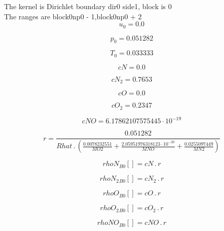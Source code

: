 \documentclass{article}
\begin{document}
\noindent The kernel is Dirichlet boundary dir0 side1, block is 0\\\noindent The ranges are block0np0 - 1,block0np0 + 2\\\begin{dmath}u_{0} = 0.0\end{dmath}

\begin{dmath}p_{0} = 0.051282\end{dmath}

\begin{dmath}T_{0} = 0.033333\end{dmath}

\begin{dmath}cN = 0.0\end{dmath}

\begin{dmath}cN_{2} = 0.7653\end{dmath}

\begin{dmath}cO = 0.0\end{dmath}

\begin{dmath}cO_{2} = 0.2347\end{dmath}

\begin{dmath}cNO = 6.17862107575445 \cdot 10^{-19}\end{dmath}

\begin{dmath}r = \frac{0.051282}{Rhat \,.\, \left(\frac{0.0078232551}{MO2} + \frac{2.05951976318123 \cdot 10^{-20}}{MNO} + \frac{0.0255097449}{MN2}\right)}\end{dmath}

\begin{dmath}{rhoN{_{B0}}}[{}] = cN \,.\, r\end{dmath}

\begin{dmath}{rhoN_{2}{_{B0}}}[{}] = cN_{2} \,.\, r\end{dmath}

\begin{dmath}{rhoO{_{B0}}}[{}] = cO \,.\, r\end{dmath}

\begin{dmath}{rhoO_{2}{_{B0}}}[{}] = cO_{2} \,.\, r\end{dmath}

\begin{dmath}{rhoNO{_{B0}}}[{}] = cNO \,.\, r\end{dmath}
\end{document}

